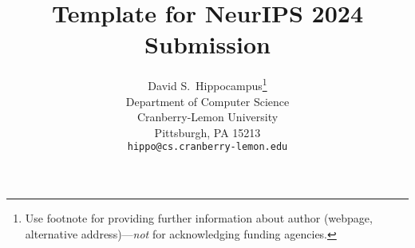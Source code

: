 \documentclass{article}
\title{Template for NeurIPS 2024 Submission}
\author{%
  David S.~Hippocampus\thanks{Use footnote for providing further information
    about author (webpage, alternative address)---\emph{not} for acknowledging
    funding agencies.} \\
  Department of Computer Science\\
  Cranberry-Lemon University\\
  Pittsburgh, PA 15213 \\
  \texttt{hippo@cs.cranberry-lemon.edu} \\
}
\begin{document}
\maketitle















\newpage




\newpage

\newpage
\appendix
\appendixpage
\end{document}
